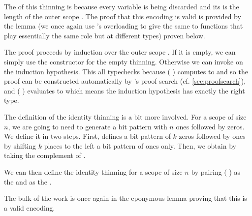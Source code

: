 
The  of this thinning is  because
every variable is being discarded and its  is
the length of the outer scope .
%
The proof that this encoding is valid is provided by
the  lemma (we once again use \idris{}'s overloading
to give the same to functions that play essentially the same role but at
different types) proven below.


The proof proceeds by induction over the outer scope . If it
is empty, we can simply use the constructor for the empty thinning.
%
Otherwise we can invoke  on the induction hypothesis.
%
This all typechecks because (  )
computes to  and so the  proof can be constructed
automatically by \idris{}'s proof search (cf. \cref{sec:proofsearch}),
%
and (  ) evaluates to 
which means the induction hypothesis has exactly the right type.


The definition of the identity thinning is a bit more involved.
%
For a scope of size $n$, we are going to need to generate a bit pattern with
$n$ ones followed by zeros.
%
We define it in two steps.
%
First,  defines a bit pattern of $k$ zeros followed by ones
by shifting $k$ places to the left a bit pattern of ones only.
%
Then, we obtain  by taking the complement of .

\noindent
\begin{minipage}{.45\textwidth}
\end{minipage}\hfill
\begin{minipage}{.45\textwidth}
\end{minipage}

We can then define the identity thinning for a scope of size $n$ by pairing
( ) as the
 and 
as the .


The bulk of the work is once again in the eponymous lemma proving that this
is a valid encoding.

